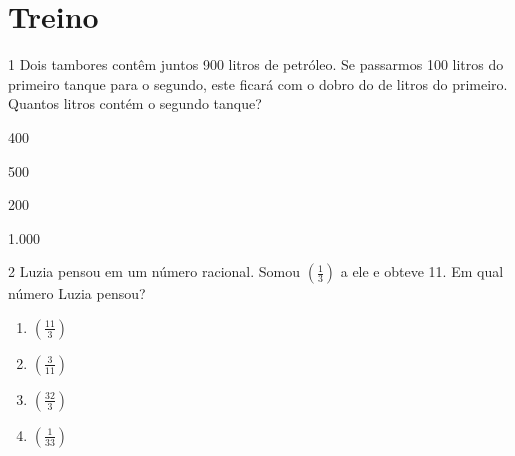 \section{Treino}


\num{1} Dois tambores contêm juntos 900 litros de petróleo. Se passarmos 100
litros do primeiro tanque para o segundo, este ficará com o dobro do de
litros do primeiro. Quantos litros contém o segundo tanque?

\begin{escolha}
\item 400
\item 500
\item 200
\item 1.000
\end{escolha}













\num{2} Luzia pensou em um número racional. Somou $(\frac{1}{3})$ a ele e
obteve 11. Em qual número Luzia pensou?

\begin{enumerate}
\item $(\frac{11}{3})$
\item $(\frac{3}{11})$
\item $(\frac{32}{3})$
\item $(\frac{1}{33})$
\end{enumerate}

